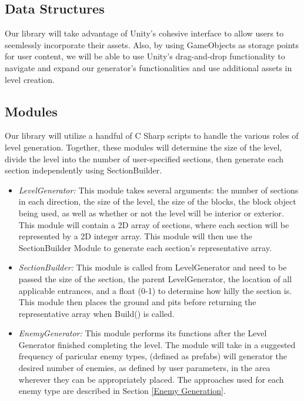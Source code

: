 \documentclass[pdftex,12pt,letter]{article}
\begin{document}
\begin{itemize}
\begin{itemize}
\begin{itemize}
\subsection{Data Structures}
Our library will take advantage of Unity's cohesive interface to allow users to seemlessly incorporate their assets.  Also, by using GameObjects as storage points for user content, we will be able to use Unity's drag-and-drop functionality to navigate and expand our generator's functionalities and use additional assets in level creation.
\subsection{Modules}\label{Modules}
Our library will utilize a handful of C Sharp scripts to handle the various roles of level generation. Together, these modules will determine the size of the level, divide the level into the number of user-specified sections, then generate each section independently using SectionBuilder. 
\begin{itemize}

\item \textit{LevelGenerator:} This module takes several arguments: the number of sections in each direction, the size of the level, the size of the blocks, the block object being used, as well as whether or not the level will be interior or exterior. This module will contain a 2D array of sections, where each section will be represented by a 2D integer array. This module will then use the SectionBuilder Module to generate each section's representative array.

\item \textit{SectionBuilder:} This module is called from LevelGenerator and need to be passed the size of the section, the parent LevelGenerator, the location of all applicable entrances, and a float (0-1) to determine how hilly the section is. This module then places the ground and pits before returning the representative array when Build() is called.

\item \textit{EnemyGenerator:} This module performs its functions after the Level Generator finished completing the level. The module will take in a suggested frequency of paricular enemy types, (defined as prefabs) will generator the desired number of enemies, as defined by user parameters, in the area wherever they can be appropriately placed. The approaches used for each enemy type are described in Section \ref{Enemy Generation}.


\end{itemize}
\end{itemize}
\end{itemize}
\end{itemize}
\end{document}
